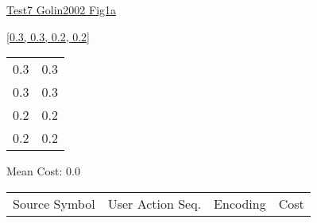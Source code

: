 \documentclass[12pt]{article}
\begin{document}
\noindent \url{Test7 Golin2002 Fig1a}

\noindent \url{[0.3, 0.3, 0.2, 0.2]}

\noindent\begin{tt}
\begin{small}
\begin{bundle}{}
\end{bundle}
\end{small}
\end{tt}
\newpage%
\begin{tabular}{l l}0.3	&	0.3\\
0.3	&	0.3\\
0.2	&	0.2\\
0.2	&	0.2\\
\end{tabular}\newpage
\noindent
\noindent Mean Cost: 0.0\\
\begin{tabular}{l l l l}
Source Symbol	&	User Action Seq.	&	Encoding	&	Cost\\
\end{tabular}
\end{document}
